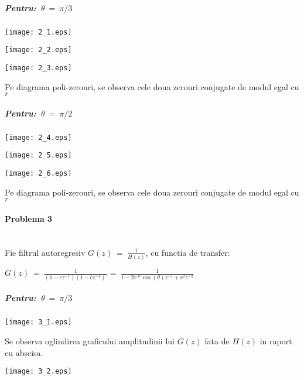 \documentclass[12pt,english]{article}
\newcommand{\myparagraph}[1]{\paragraph{#1}\mbox{}\\}
\begin{document}
\subparagraph {Pentru:\ $\displaystyle \theta \ =\ \pi /3$}

\begin{center}
\texttt{[image: 2\_1.eps]}
\end{center}

\begin{center}
\texttt{[image: 2\_2.eps]}
\end{center}

\begin{center}
\texttt{[image: 2\_3.eps]}
\end{center}

Pe diagrama poli-zerouri, se observa cele doua zerouri conjugate de modul egal cu $r$

\subparagraph {Pentru:\ $\displaystyle \theta \ =\ \pi /2$}

\begin{center}
\texttt{[image: 2\_4.eps]}
\end{center}

\begin{center}
\texttt{[image: 2\_5.eps]}
\end{center}

\begin{center}
\texttt{[image: 2\_6.eps]}
\end{center}

Pe diagrama poli-zerouri, se observa cele doua zerouri conjugate de modul egal cu $r$

\pagebreak
\myparagraph {Problema 3}

Fie filtrul autoregresiv $\displaystyle G( z) \ =\ \frac{1}{H( z)}$, cu functia de transfer:

\begin{center}
$\displaystyle G( z) \ =\ \frac{1}{\left( 1-cz^{-1}\right)\left( 1-\overline{c} z^{-1}\right) \ } =\ \frac{1}{1-2r*\cos( \theta ) z^{-1} +r^{2} z^{-2}}$
\end{center}

\subparagraph {Pentru:\ $\displaystyle \theta \ =\ \pi /3$}

\begin{center}
\texttt{[image: 3\_1.eps]}
\end{center}

Se observa oglindirea graficului amplitudinii lui $G(z)$ fata de $H(z)$ in raport cu abscisa.

\begin{center}
\texttt{[image: 3\_2.eps]}
\end{center}
\end{document}
